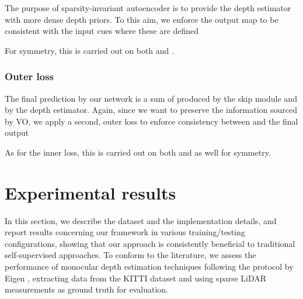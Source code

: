 \documentclass[10pt,twocolumn,letterpaper]{article}
\begin{document}
The purpose of sparsity-invariant autoencoder is to provide the depth estimator with more dense depth priors. To this aim, we enforce the output map  to be consistent with the input cues  where these are defined 


For symmetry, this is carried out on both  and .

\subsubsection{Outer loss}

The final prediction  by our network is a sum of  produced by the skip module and  by the depth estimator. Again, since we want to preserve the information sourced by VO, we apply a second, outer loss to enforce consistency between  and the final output


As for the inner loss, this is carried out on both  and  as well for symmetry.

     \section{Experimental results}
\label{results}

In this section, we describe the dataset and the implementation details, and report results concerning our framework in various training/testing configurations, showing that our approach is consistently beneficial to traditional self-supervised approaches. To conform to the literature, we assess the performance of monocular depth estimation techniques following the protocol by Eigen \etal \cite{Eigen}, extracting data from the KITTI \cite{kitti} dataset and using sparse LiDAR measurements as ground truth for evaluation. 
\end{document}
